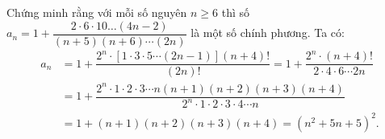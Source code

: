 \begin{ex}%
  Chứng minh rằng với mỗi số nguyên $n \ge 6$ thì số
$a_n=1+\dfrac{2 \cdot 6 \cdot 10 \ldots (4n-2)}{(n+5)(n+6) \cdots (2n)}$ là một số chính phương.
\loigiai
{
	 Ta có:
	 \begin{align*}
	 	a_n&=1+\dfrac{2^n \cdot \left[1 \cdot 3 \cdot 5 \cdots (2n-1)\right](n+4)!}{(2n)!} = 1+\dfrac{2^n \cdot (n+4)!}{2 \cdot 4 \cdot 6 \cdots 2n} \\
	 	&=1+\dfrac{2^n \cdot 1 \cdot 2 \cdot 3 \cdots n(n+1)(n+2)(n+3)(n+4)}{2^n \cdot 1 \cdot 2 \cdot 3 \cdot 4 \cdots n} \\
	 	&=1+(n+1)(n+2)(n+3)(n+4)= \left(n^2+5n+5\right)^2.
	 \end{align*}
}
\end{ex}

